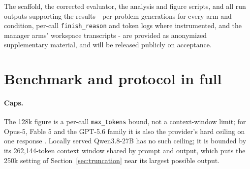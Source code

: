 \documentclass{article}
\newif\iffinalversion
\begin{document}
\iffinalversion
The data generated and analysed during this study, the orchestration scaffold (both
versions), the corrected LiveCodeBench evaluator, and the
analysis and figure scripts that produce every number and figure in this paper are available at
\url{https://github.com/slee-persis/GVS5H}, together with all run outputs supporting the results
- per-problem generations for every arm and condition, per-call \texttt{finish\_reason} and
token logs where instrumented, and the manager arms' workspace transcripts (\texttt{runs/}).
\else
The scaffold, the corrected evaluator, the analysis and figure scripts, and all run outputs
supporting the results - per-problem generations for every arm and condition, per-call
\texttt{finish\_reason} and token logs where instrumented, and the manager arms' workspace
transcripts - are provided as anonymized supplementary material, and will be released publicly
on acceptance.
\fi

\iffinalversion

\fi

\iffinalversion
%
%
%
\fi




\appendix

\section{Benchmark and protocol in full}
\label{app:protocol}

\paragraph{Caps.} The 128k figure is a per-call \texttt{max\_tokens} bound, not a context-window
limit; for Opus-5, Fable 5 and the GPT-5.6 family it is also the provider's hard ceiling on one
response \citep{anthropic2026,openai2026}. Locally served Qwen3.8-27B has no such ceiling; it is
bounded by its 262{,}144-token context window \citep{qwen2026c} shared by prompt and output,
which puts the 250k setting of Section~\ref{sec:truncation} near its largest possible output.
\end{document}
